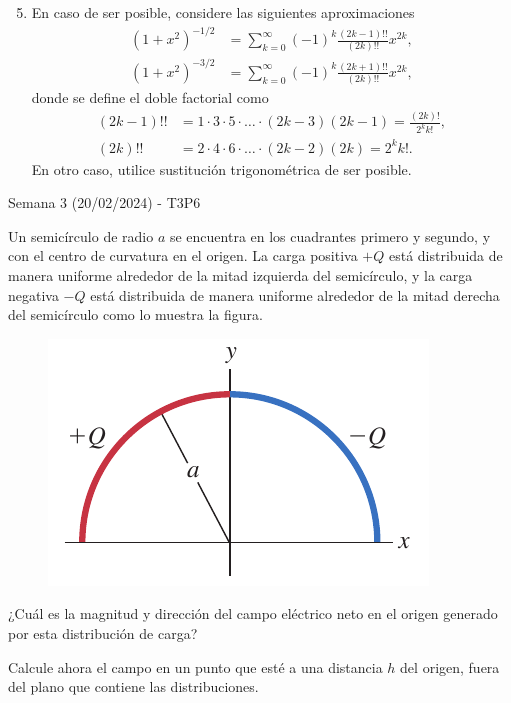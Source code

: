 \begin{frame}{}
    \begin{enumerate}
        \setcounter{enumi}{4}
        \item En caso de ser posible, considere las siguientes aproximaciones
        \begin{equation*}
        \begin{aligned}
            (1+x^2)^{-1/2}&=\sum_{k=0}^\infty (-1)^k\frac{(2k-1)!!}{(2k)!!}x^{2k},\\
            (1+x^2)^{-3/2}&=\sum_{k=0}^\infty (-1)^k\frac{(2k+1)!!}{(2k)!!}x^{2k},
        \end{aligned}
        \end{equation*}
        donde se define el doble factorial como 
        \begin{equation*}
            \begin{aligned}
            (2k-1)!!&=1\cdot3\cdot5\cdot\dots\cdot(2k-3)(2k-1)=\frac{(2k)!}{2^kk!},\\
            (2k)!!&=2\cdot4\cdot6\cdot\dots\cdot(2k-2)(2k)=2^kk!.
            \end{aligned}
        \end{equation*}
        En otro caso, utilice sustitución trigonométrica de ser posible.
    \end{enumerate}
\end{frame}

\begin{frame}{Semana 3 (20/02/2024) - T3P6}

Un semicírculo de radio $a$ se encuentra en los cuadrantes primero y segundo, y con el centro de curvatura en el origen. La carga positiva $+Q$ está distribuida de manera uniforme alrededor de la mitad izquierda del semicírculo, y la carga negativa $-Q$ está distribuida de manera uniforme
alrededor de la mitad derecha del semicírculo como lo muestra la figura.

\begin{figure}
    \centering
    \includegraphics[scale=0.3]{figures/t3p6.png}
\end{figure}

¿Cuál es la magnitud y dirección del campo eléctrico neto en el origen generado por esta distribución de carga?

Calcule ahora el campo en un punto que esté a una distancia $h$ del origen, fuera del plano que contiene las distribuciones.
    
\end{frame}


